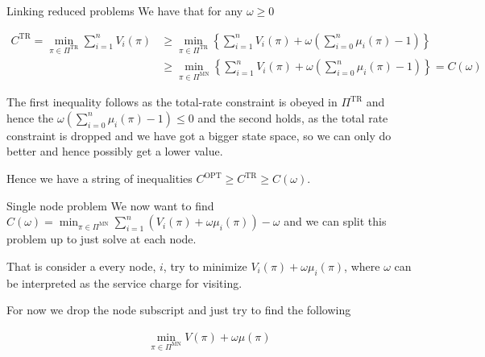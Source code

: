 \documentclass[10pt]{beamer}
\begin{document}
\begin{frame}{Linking reduced problems}
We have that for any $\omega \geq 0$

\begin{align*}
C^{\text{TR}}=\min_{\pi \in \Pi^{\text{TR}}} \sum\limits_{i=1}^{n} V_{i}(\pi) &\geq \min_{\pi \in \Pi^{\text{TR}}} \left\{ \sum\limits_{i=1}^{n} V_{i}(\pi) + \omega \left( \sum\limits_{i=0}^{n} \mu_{i}(\pi) -1 \right) \right\} \\
&\geq \min_{\pi \in \Pi^{\text{MN}}} \left\{ \sum\limits_{i=1}^{n} V_{i}(\pi) + \omega \left( \sum\limits_{i=0}^{n} \mu_{i}(\pi) -1 \right) \right\}=C(\omega)
\end{align*}

The first inequality follows as the total-rate constraint is obeyed in $\Pi^{\text{TR}}$ and hence the $\omega \left( \sum\limits_{i=0}^{n} \mu_{i}(\pi) -1 \right) \leq 0$ and the second holds, as the total rate constraint is dropped and we have got a bigger state space, so we can only do better and hence possibly get a lower value.

Hence we have a string of inequalities $C^{\text{OPT}} \geq C^{\text{TR}} \geq C(\omega)$.
\end{frame}

\begin{frame}{Single node problem}
We now want to find $C(\omega)=\min_{\pi \in \Pi^{\text{MN}}} \sum\limits_{i=1}^{n} (V_{i}(\pi)+\omega \mu_{i}(\pi)) - \omega$ and we can split this problem up to just solve at each node.

That is consider a every node, $i$, try to minimize $V_{i}(\pi)+\omega \mu_{i}(\pi)$, where $\omega$ can be interpreted as the service charge for visiting.

For now we drop the node subscript and just try to find the following

\begin{align*}
\min_{\pi \in \Pi^{\text{MN}}} V(\pi) + \omega \mu(\pi)
\end{align*}

\end{frame}
\end{document}
